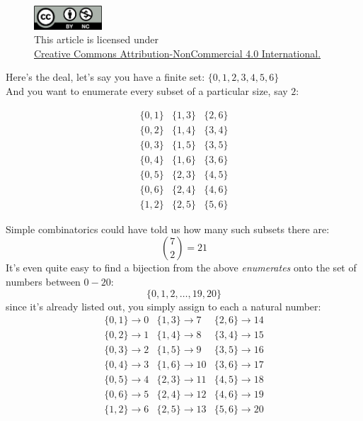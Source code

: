 \documentclass[twoside]{article}
\begin{document}
\begin{figure}[h]
\centering
\includegraphics[width=1in]{../../../cc-by-nc.png}\\[0.1in]
\tiny This article is licensed under \\
\href{http://creativecommons.org/licenses/by-nc/4.0/}
{Creative Commons Attribution-NonCommercial 4.0 International.}\\[0.3in]
\end{figure}

Here's the deal, let's say you have a finite set: $ \{0, 1, 2, 3, 4, 5, 6\} $\\[0.1cm]

And you want to enumerate every subset of a particular size, say $ 2 $:

$$ \begin{array}{ccc}
\{0, 1\} & \{1, 3\} & \{2, 6\} \\
\{0, 2\} & \{1, 4\} & \{3, 4\} \\
\{0, 3\} & \{1, 5\} & \{3, 5\} \\
\{0, 4\} & \{1, 6\} & \{3, 6\} \\
\{0, 5\} & \{2, 3\} & \{4, 5\} \\
\{0, 6\} & \{2, 4\} & \{4, 6\} \\
\{1, 2\} & \{2, 5\} & \{5, 6\}
\end{array} $$

Simple combinatorics could have told us how many such subsets there are:
$$ {7\choose 2}=21 $$
It's even quite easy to find a bijection from the above \emph{enumerates} onto the set of numbers between $ 0-20 $:
$$ \{0, 1, 2,\ldots , 19, 20\} $$
since it's already listed out, you simply assign to each a natural number:
$$ \begin{array}{lll}
\{0, 1\} \to 0 & \{1, 3\} \to 7 & \{2, 6\} \to 14 \\
\{0, 2\} \to 1 & \{1, 4\} \to 8 & \{3, 4\} \to 15 \\
\{0, 3\} \to 2 & \{1, 5\} \to 9 & \{3, 5\} \to 16 \\
\{0, 4\} \to 3 & \{1, 6\} \to 10 & \{3, 6\} \to 17 \\
\{0, 5\} \to 4 & \{2, 3\} \to 11 & \{4, 5\} \to 18 \\
\{0, 6\} \to 5 & \{2, 4\} \to 12 & \{4, 6\} \to 19 \\
\{1, 2\} \to 6 & \{2, 5\} \to 13 & \{5, 6\} \to 20
\end{array} $$
\end{document}
